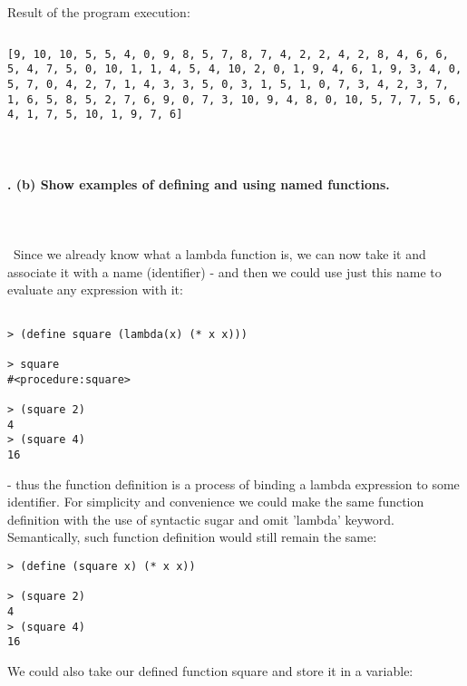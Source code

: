 \documentclass{article}
\begin{document}
\paragraph{}\

	Result of the program execution:
\begin{verbatim}

\end{verbatim}
\noindent \texttt{[9, 10, 10, 5, 5, 4, 0, 9, 8, 5, 7, 8, 7, 4, 2, 2, 4, 2, 8, 4, 6, 6, 5, 4, 7, 5, 0, 10, 1, 1, 4, 5, 4, 10, 2, 0, 1, 9, 4, 6, 1, 9, 3, 4, 0, 5, 7, 0, 4, 2, 7, 1, 4, 3, 3, 5, 0, 3, 1, 5, 1, 0, 7, 3, 4, 2, 3, 7, 1, 6, 5, 8, 5, 2, 7, 6, 9, 0, 7, 3, 10, 9, 4, 8, 0, 10, 5, 7, 7, 5, 6, 4, 1, 7, 5, 10, 1, 9, 7, 6]}

\paragraph{}\
\paragraph{. (b) Show examples of defining and using named functions.}\
\paragraph{}\
Since we already know what a lambda function is, we can now take it and associate it with a name (identifier) - and then we could use just this name to evaluate any expression with it:

\begin{verbatim} 
 
> (define square (lambda(x) (* x x)))

> square
#<procedure:square>

> (square 2)
4
> (square 4)
16
\end{verbatim}
- thus the function definition is a process of binding a lambda expression to some identifier. For simplicity and convenience we could make the same function definition with the use of syntactic sugar and omit 'lambda' keyword. Semantically, such function definition would still remain the same:

\begin{verbatim} 
> (define (square x) (* x x))

> (square 2)
4
> (square 4)
16
\end{verbatim}

We could also take our defined function square and store it in a variable:
\end{document}
